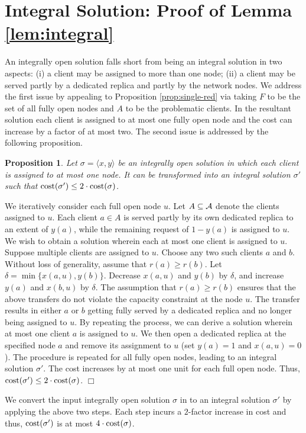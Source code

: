 \documentclass[11pt]{article}
\newtheorem{proposition}{Proposition}[section]
\newcommand{\calA} {{\cal A}}
\newcommand{\pair}[2] {\langle #1, #2\rangle}
\newcommand{\cost} {{\rm cost}}
\newcommand{\qed} {\hfill$\Box$}
\begin{document}
\section{Integral Solution: Proof of Lemma \ref{lem:integral}}
\label{sec:integral}
An integrally open solution falls short from being an integral solution in two aspects:
(i) a client may be assigned to more than one node;
(ii) a client may be served partly by a dedicated replica and partly by the network nodes.
We address the first issue by appealing to Proposition \ref{prop:single-red} via taking
$F$ to be the set of all fully open nodes and $A$ to be the problematic clients.
In the resultant solution each client is assigned to at most one fully open node 
and the cost can increase by a factor of at most two.
The second issue is addressed by the following proposition.

\begin{proposition}
Let $\sigma=\pair{x}{y}$ be an integrally open solution in which 
each client is assigned to at most one node. It can be transformed into an integral solution $\sigma'$
such that $\cost(\sigma') \leq 2\cdot \cost(\sigma)$.
\end{proposition}
\proof
We iteratively consider each full open node $u$. Let $A\subseteq \calA$ denote the clients assigned to $u$.
Each client $a\in A$ is served partly by its own dedicated replica to an extent of $y(a)$, while
the remaining request of $1-y(a)$ is assigned to $u$. We wish to obtain a solution wherein each 
at most one client is assigned to $u$. Suppose multiple clients are assigned to $u$.
Choose any two such clients $a$ and $b$. Without loss of generality, assume that $r(a) \geq r(b)$.
Let $\delta = \min\{x(a, u), y(b)\}$. Decrease $x(a, u)$ and $y(b)$ by $\delta$, 
and increase $y(a)$ and $x(b, u)$ by $\delta$. The assumption that $r(a) \geq r(b)$ ensures that
the above transfers do not violate the capacity constraint at the node $u$.
The transfer results in either $a$ or $b$ getting fully served by a dedicated replica 
and no longer being assigned to $u$. By repeating the process, we can derive a solution 
wherein at most one client $a$ is assigned to $u$. We then open a dedicated replica at the 
specified node $a$ and remove its assignment to $u$ (set $y(a) = 1$ and $x(a, u) = 0$).
The procedure is repeated for all fully open nodes, leading to an integral solution $\sigma'$.
The cost increases by at most one unit for each full open node. Thus, $\cost(\sigma') \leq 2\cdot \cost(\sigma)$.
\qed

We convert the input integrally open solution $\sigma$ in to an integral solution
$\sigma'$ by applying the above two steps.
Each step incurs a $2$-factor increase in cost and thus, $\cost(\sigma')$ is at  most $4\cdot \cost(\sigma)$.



\end{document}
